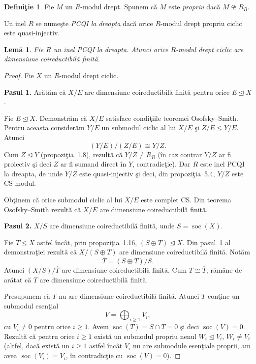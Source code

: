 \documentclass[12pt,a4paper]{book}
\DeclareMathOperator{\soc}{soc}
\newcommand{\ess}{\trianglelefteq}  %
\theoremstyle{plain}
\newtheorem{lemma}[theorem]{Lemă}
\theoremstyle{definition}
\newtheorem{definition}[theorem]{Definiţie}
\theoremstyle{remark}
\begin{document}
\begin{definition}\label{def:6.1}
Fie \(M\) un \(R\)-modul drept. Spunem că \(M\) este \emph{propriu} dacă
\(M \ncong R_R\).

Un inel \(R\) se numeşte \emph{PCQI la dreapta} dacă orice
\(R\)-modul drept propriu ciclic este quasi-injectiv.
\end{definition}

\begin{lemma}\label{lem:6.2}
Fie \(R\) un inel PCQI la dreapta. Atunci orice \(R\)-modul drept ciclic
are dimensiune coireductibilă finită.
\end{lemma}

\begin{proof}
Fie \(X\) un \(R\)-modul drept ciclic.

\medskip
\noindent\textbf{Pasul 1.} Arătăm că \(X/E\) are dimensiune
coireductibilă finită pentru orice \(E \ess X\).

Fie \(E \ess X\). Demonstrăm că \(X/E\) satisface condiţiile teoremei
Osofsky--Smith. Pentru aceasta considerăm \(Y/E\) un submodul ciclic al
lui \(X/E\) şi \(Z/E \leq Y/E\). Atunci
\[
  (Y/E)/(Z/E) \cong Y/Z.
\]
Cum \(Z \ess Y\) (propoziţia~1.8), rezultă că \(Y/Z \neq R_R\) (în caz
contrar \(Y/Z\) ar fi proiectiv şi deci \(Z\) ar fi sumand direct în
\(Y\), contradicţie). Dar \(R\) este inel PCQI la dreapta, de unde
\(Y/Z\) este quasi-injectiv şi deci, din propoziţia~5.4,
\(Y/Z\) este CS-modul.

Obţinem că orice submodul ciclic al lui \(X/E\) este complet CS. Din
teorema Osofsky--Smith rezultă că \(X/E\) are dimensiune
coireductibilă finită.

\medskip
\noindent\textbf{Pasul 2.} \(X/S\) are dimensiune coireductibilă finită,
unde \(S = \soc(X)\).

Fie \(T \leq X\) astfel încât, prin propoziţia~1.16,
\((S \oplus T) \ess X\). Din pasul~1 al demonstraţiei rezultă că
\(X/(S \oplus T)\) are dimensiune coireductibilă finită. Notăm
\[
  \overline{T} = (S \oplus T)/S.
\]
Atunci \((X/S)/\overline{T}\) are dimensiune coireductibilă finită.
Cum \(T \cong \overline{T}\), rămâne de arătat că \(T\) are dimensiune
coireductibilă finită.

Presupunem că \(T\) nu are dimensiune coireductibilă finită. Atunci
\(T\) conţine un submodul esenţial
\[
  V = \bigoplus_{i \geq 1} V_i,
\]
cu \(V_i \neq 0\) pentru orice \(i \geq 1\). Avem
\(\soc(T) = S \cap T = 0\) şi deci \(\soc(V) = 0\). Rezultă că pentru
orice \(i \geq 1\) există un submodul propriu nenul
\(W_i \ess V_i\), \(W_i \neq V_i\) (altfel, dacă există un \(i \geq 1\)
astfel încât \(V_i\) nu are submodule esenţiale proprii, am avea
\(\soc(V_i) = V_i\), în contradicţie cu \(\soc(V) = 0\)).


\end{proof}
\end{document}

